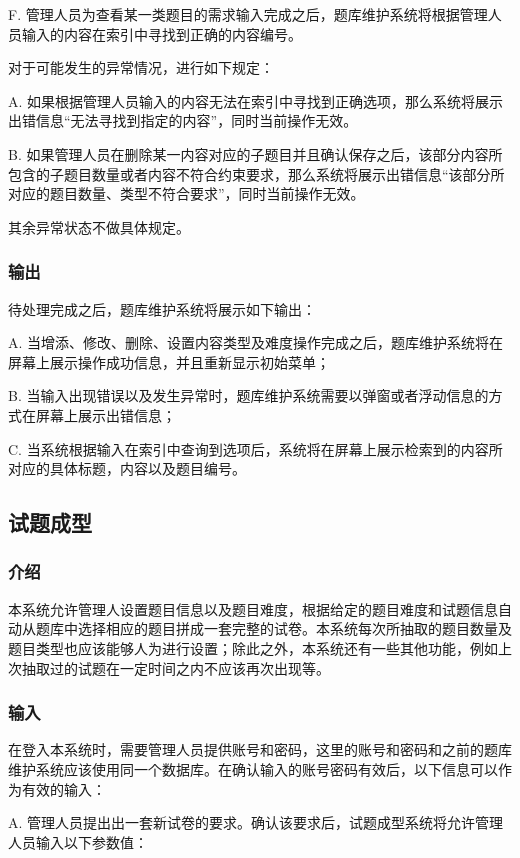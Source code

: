 F. 管理人员为查看某一类题目的需求输入完成之后，题库维护系统将根据管理人员输入的内容在索引中寻找到正确的内容编号。

对于可能发生的异常情况，进行如下规定：

A. 如果根据管理人员输入的内容无法在索引中寻找到正确选项，那么系统将展示出错信息“无法寻找到指定的内容”，同时当前操作无效。

B. 如果管理人员在删除某一内容对应的子题目并且确认保存之后，该部分内容所包含的子题目数量或者内容不符合约束要求，那么系统将展示出错信息“该部分所对应的题目数量、类型不符合要求”，同时当前操作无效。

其余异常状态不做具体规定。

\subsubsection{输出}
待处理完成之后，题库维护系统将展示如下输出：

A. 当增添、修改、删除、设置内容类型及难度操作完成之后，题库维护系统将在屏幕上展示操作成功信息，并且重新显示初始菜单；

B. 当输入出现错误以及发生异常时，题库维护系统需要以弹窗或者浮动信息的方式在屏幕上展示出错信息；

C. 当系统根据输入在索引中查询到选项后，系统将在屏幕上展示检索到的内容所对应的具体标题，内容以及题目编号。


\subsection{试题成型}

\subsubsection{介绍}
本系统允许管理人设置题目信息以及题目难度，根据给定的题目难度和试题信息自动从题库中选择相应的题目拼成一套完整的试卷。本系统每次所抽取的题目数量及题目类型也应该能够人为进行设置；除此之外，本系统还有一些其他功能，例如上次抽取过的试题在一定时间之内不应该再次出现等。

\subsubsection{输入}
在登入本系统时，需要管理人员提供账号和密码，这里的账号和密码和之前的题库维护系统应该使用同一个数据库。在确认输入的账号密码有效后，以下信息可以作为有效的输入：

A. 管理人员提出出一套新试卷的要求。确认该要求后，试题成型系统将允许管理人员输入以下参数值：

